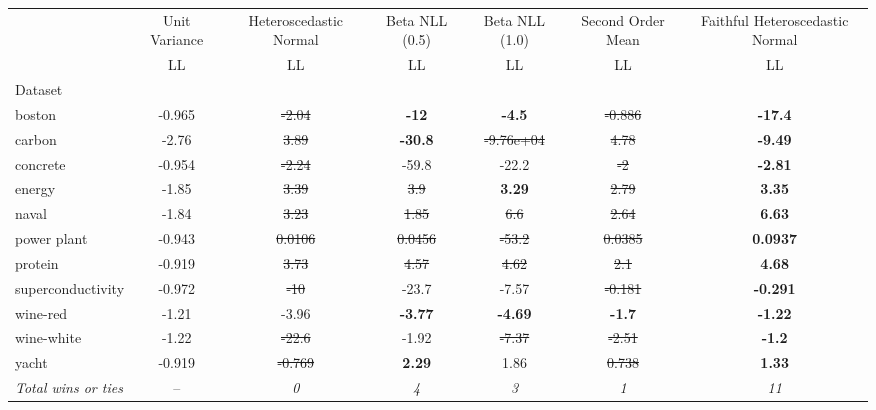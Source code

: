\begin{tabular}{l|c|c|c|c|c|c}
\toprule
{} & {Unit Variance} & {Heteroscedastic Normal} & {Beta NLL (0.5)} & {Beta NLL (1.0)} & {Second Order Mean} & {Faithful Heteroscedastic Normal} \\
{} & {LL} & {LL} & {LL} & {LL} & {LL} & {LL} \\
{Dataset} & {} & {} & {} & {} & {} & {} \\
\midrule
boston & -0.965 & \sout{-2.04} & \textbf{-12} & \textbf{-4.5} & \sout{-0.886} & \textbf{-17.4} \\
carbon & -2.76 & \sout{3.89} & \textbf{-30.8} & \sout{-9.76e+04} & \sout{4.78} & \textbf{-9.49} \\
concrete & -0.954 & \sout{-2.24} & -59.8 & -22.2 & \sout{-2} & \textbf{-2.81} \\
energy & -1.85 & \sout{3.39} & \sout{3.9} & \textbf{3.29} & \sout{2.79} & \textbf{3.35} \\
naval & -1.84 & \sout{3.23} & \sout{1.85} & \sout{6.6} & \sout{2.64} & \textbf{6.63} \\
power plant & -0.943 & \sout{0.0106} & \sout{0.0456} & \sout{-53.2} & \sout{0.0385} & \textbf{0.0937} \\
protein & -0.919 & \sout{3.73} & \sout{4.57} & \sout{4.62} & \sout{2.1} & \textbf{4.68} \\
superconductivity & -0.972 & \sout{-10} & -23.7 & -7.57 & \sout{-0.181} & \textbf{-0.291} \\
wine-red & -1.21 & -3.96 & \textbf{-3.77} & \textbf{-4.69} & \textbf{-1.7} & \textbf{-1.22} \\
wine-white & -1.22 & \sout{-22.6} & -1.92 & \sout{-7.37} & \sout{-2.51} & \textbf{-1.2} \\
yacht & -0.919 & \sout{-0.769} & \textbf{2.29} & 1.86 & \sout{0.738} & \textbf{1.33} \\
\textit{{Total wins or ties}} & -- & \textit{0} & \textit{4} & \textit{3} & \textit{1} & \textit{11} \\
\bottomrule
\end{tabular}

